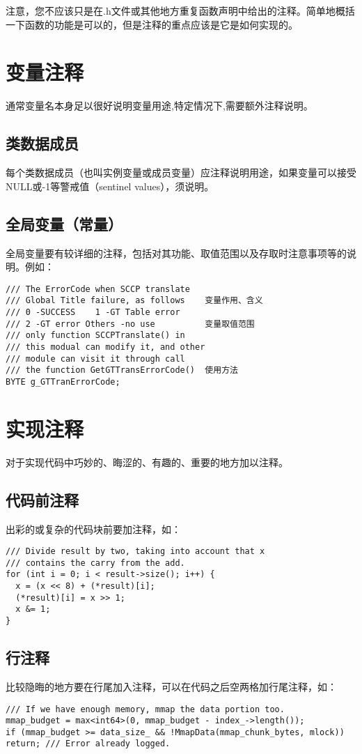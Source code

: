 注意，您不应该只是在.h文件或其他地方重复函数声明中给出的注释。简单地概括一下函数的功能是可以的，但是注释的重点应该是它是如何实现的。


\section{变量注释}
通常变量名本身足以很好说明变量用途,特定情况下,需要额外注释说明。


\subsection{类数据成员}
每个类数据成员（也叫实例变量或成员变量）应注释说明用途，如果变量可以接受NULL或-1等警戒值（sentinel values），须说明。


\subsection{全局变量（常量）}
全局变量要有较详细的注释，包括对其功能、取值范围以及存取时注意事项等的说明。例如：
\begin{verbatim}
/// The ErrorCode when SCCP translate
/// Global Title failure, as follows    变量作用、含义
/// 0 -SUCCESS    1 -GT Table error
/// 2 -GT error Others -no use          变量取值范围
/// only function SCCPTranslate() in
/// this modual can modify it, and other
/// module can visit it through call
/// the function GetGTTransErrorCode()  使用方法
BYTE g_GTTranErrorCode;
\end{verbatim}


\section{实现注释}
对于实现代码中巧妙的、晦涩的、有趣的、重要的地方加以注释。


\subsection{代码前注释}
出彩的或复杂的代码块前要加注释，如：
\begin{verbatim}
/// Divide result by two, taking into account that x
/// contains the carry from the add.
for (int i = 0; i < result->size(); i++) {
  x = (x << 8) + (*result)[i];
  (*result)[i] = x >> 1;
  x &= 1;
}
\end{verbatim}


\subsection{行注释}
比较隐晦的地方要在行尾加入注释，可以在代码之后空两格加行尾注释，如：
\begin{verbatim}
/// If we have enough memory, mmap the data portion too.
mmap_budget = max<int64>(0, mmap_budget - index_->length());
if (mmap_budget >= data_size_ && !MmapData(mmap_chunk_bytes, mlock))
return; /// Error already logged.
\end{verbatim}

